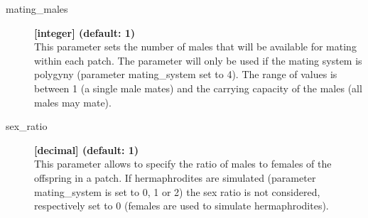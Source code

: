 \documentclass[letterpaper,12pt,oneside]{book}
\begin{document}
\begin{description}
\item[mating\_males] \textbf{[integer] (default: 1)}\\
This parameter sets the number of males that will be available for mating within each patch. The parameter will only be used if the mating system is polygyny (parameter \textsf{mating\_system} set to 4). The range of values is between 1 (a single male mates) and the carrying capacity of the males (all males may mate).

\item[sex\_ratio] \textbf{[decimal] (default: 1)}\\
This parameter allows to specify the ratio of males to females of the offspring in a patch. If hermaphrodites are simulated (parameter \textsf{mating\_system} is set to 0, 1 or 2) the sex ratio is not considered, respectively set to 0 (females are used to simulate hermaphrodites).



\end{description}
\end{document}
